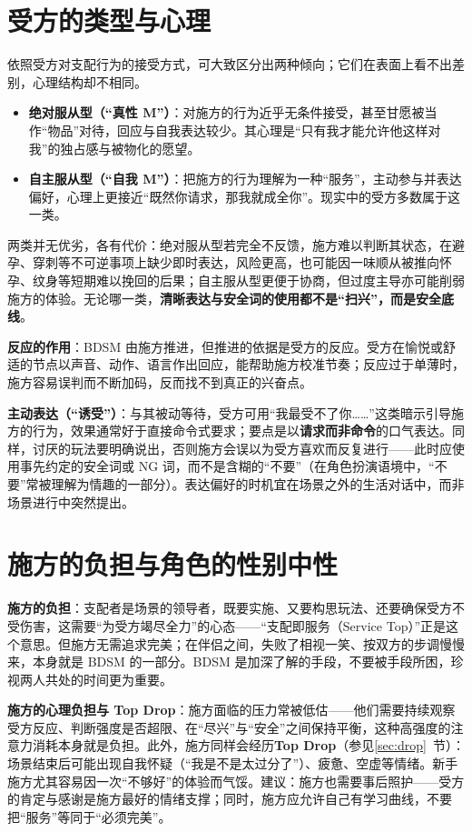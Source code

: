 \documentclass[12pt,UTF8]{ctexbook}
\newcommand{\keyword}[1]{\textbf{#1}}
\begin{document}
\section{受方的类型与心理}

依照受方对支配行为的接受方式，可大致区分出两种倾向；它们在表面上看不出差别，心理结构却不相同。

\begin{itemize}
\item \textbf{绝对服从型（“真性 M”）}：对施方的行为近乎无条件接受，甚至甘愿被当作“物品”对待，回应与自我表达较少。其心理是“只有我才能允许他这样对我”的独占感与被物化的愿望。
\item \textbf{自主服从型（“自我 M”）}：把施方的行为理解为一种“服务”，主动参与并表达偏好，心理上更接近“既然你请求，那我就成全你”。现实中的受方多数属于这一类。
\end{itemize}

两类并无优劣，各有代价：绝对服从型若完全不反馈，施方难以判断其状态，在避孕、穿刺等不可逆事项上缺少即时表达，风险更高，也可能因一味顺从被推向怀孕、纹身等短期难以挽回的后果；自主服从型更便于协商，但过度主导亦可能削弱施方的体验。无论哪一类，\keyword{清晰表达与安全词的使用都不是“扫兴”，而是安全底线}。

\noindent\textbf{反应的作用}：BDSM 由施方推进，但推进的依据是受方的反应。受方在愉悦或舒适的节点以声音、动作、语言作出回应，能帮助施方校准节奏；反应过于单薄时，施方容易误判而不断加码，反而找不到真正的兴奋点。

\noindent\textbf{主动表达（“诱受”）}：与其被动等待，受方可用“我最受不了你……”这类暗示引导施方的行为，效果通常好于直接命令式要求；要点是以\keyword{请求而非命令}的口气表达。同样，讨厌的玩法要明确说出，否则施方会误以为受方喜欢而反复进行——此时应使用事先约定的安全词或 NG 词，而不是含糊的“不要”（在角色扮演语境中，“不要”常被理解为情趣的一部分）。表达偏好的时机宜在场景之外的生活对话中，而非场景进行中突然提出。

\section{施方的负担与角色的性别中性}

\noindent\textbf{施方的负担}：支配者是场景的领导者，既要实施、又要构思玩法、还要确保受方不受伤害，这需要“为受方竭尽全力”的心态——“支配即服务（Service Top）”正是这个意思。但施方无需追求完美；在伴侣之间，失败了相视一笑、按双方的步调慢慢来，本身就是 BDSM 的一部分。BDSM 是加深了解的手段，不要被手段所困，珍视两人共处的时间更为重要。

\textbf{施方的心理负担与 Top Drop}：施方面临的压力常被低估——他们需要持续观察受方反应、判断强度是否超限、在“尽兴”与“安全”之间保持平衡，这种高强度的注意力消耗本身就是负担。此外，施方同样会经历\textbf{Top Drop}（参见\ref{sec:drop}~节）：场景结束后可能出现自我怀疑（“我是不是太过分了”）、疲惫、空虚等情绪。新手施方尤其容易因一次“不够好”的体验而气馁。建议：施方也需要事后照护——受方的肯定与感谢是施方最好的情绪支撑；同时，施方应允许自己有学习曲线，不要把“服务”等同于“必须完美”。
\end{document}
